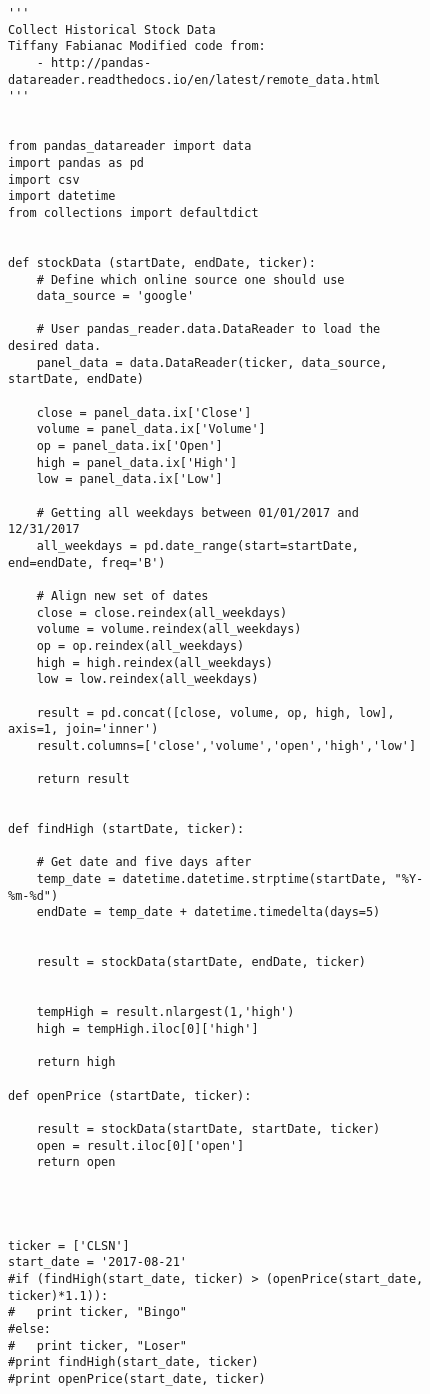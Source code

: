 \documentclass[sigconf]{acmart}
\begin{document}
\begin{figure}[htb]
\begin{verbatim}
'''
Collect Historical Stock Data
Tiffany Fabianac Modified code from:
    - http://pandas-datareader.readthedocs.io/en/latest/remote_data.html
'''


from pandas_datareader import data
import pandas as pd
import csv
import datetime
from collections import defaultdict


def stockData (startDate, endDate, ticker):
	# Define which online source one should use
	data_source = 'google'

	# User pandas_reader.data.DataReader to load the desired data.
	panel_data = data.DataReader(ticker, data_source, startDate, endDate)

	close = panel_data.ix['Close']
	volume = panel_data.ix['Volume']
	op = panel_data.ix['Open']
	high = panel_data.ix['High']
	low = panel_data.ix['Low']

	# Getting all weekdays between 01/01/2017 and 12/31/2017
	all_weekdays = pd.date_range(start=startDate, end=endDate, freq='B')

	# Align new set of dates
	close = close.reindex(all_weekdays)
	volume = volume.reindex(all_weekdays)
	op = op.reindex(all_weekdays)
	high = high.reindex(all_weekdays)
	low = low.reindex(all_weekdays)

	result = pd.concat([close, volume, op, high, low], axis=1, join='inner')
	result.columns=['close','volume','open','high','low']

	return result
	
    
def findHigh (startDate, ticker):

	# Get date and five days after
	temp_date = datetime.datetime.strptime(startDate, "%Y-%m-%d")
	endDate = temp_date + datetime.timedelta(days=5)

	
	result = stockData(startDate, endDate, ticker)


	tempHigh = result.nlargest(1,'high')
	high = tempHigh.iloc[0]['high']

	return high

def openPrice (startDate, ticker):
	
	result = stockData(startDate, startDate, ticker)
	open = result.iloc[0]['open']
	return open




ticker = ['CLSN']
start_date = '2017-08-21'
#if (findHigh(start_date, ticker) > (openPrice(start_date, ticker)*1.1)):
#	print ticker, "Bingo"
#else:
#	print ticker, "Loser"
#print findHigh(start_date, ticker)
#print openPrice(start_date, ticker)


\end{verbatim}
\end{figure}
\end{document}
